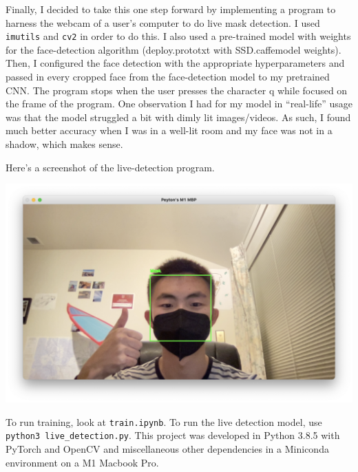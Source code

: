 Finally, I decided to take this one step forward by implementing a
program to harness the webcam of a user's computer to do live mask
detection. I used \texttt{imutils} and \texttt{cv2} in order to do this.
I also used a pre-trained model with weights for the face-detection
algorithm (deploy.prototxt with SSD.caffemodel weights). Then, I
configured the face detection with the appropriate hyperparameters and
passed in every cropped face from the face-detection model to my
pretrained CNN. The program stops when the user presses the character q
while focused on the frame of the program. One observation I had for my
model in ``real-life'' usage was that the model struggled a bit with
dimly lit images/videos. As such, I found much better accuracy when I
was in a well-lit room and my face was not in a shadow, which makes
sense.

Here's a screenshot of the live-detection program.


\includegraphics{live-detection.png}

To run training, look at \texttt{train.ipynb}. To run the live detection
model, use \texttt{python3\ live\_detection.py}. This project was
developed in Python 3.8.5 with PyTorch and OpenCV and miscellaneous
other dependencies in a Miniconda environment on a M1 Macbook Pro.
